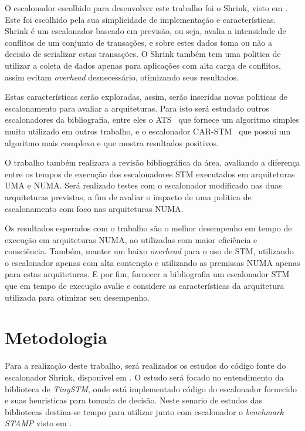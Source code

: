 \documentclass[diss-proposta,nocipinfo]{texufpel}
\begin{document}
O escalonador escolhido para desenvolver este trabalho foi o Shrink, visto em \cite{dragojevic09}. Este foi escolhido pela sua simplicidade de implementação e características. Shrink é um escalonador baseado em previsão, ou seja, avalia a intensidade de conflitos de um conjunto de transações, e sobre estes dados toma ou não a decisão de serializar estas transações. O Shrink também tem uma politica de utilizar a coleta de dados apenas para aplicações com alta carga de conflitos, assim evitam \emph{overhead} desnecessário, otimizando seus resultados.

Estas características serão exploradas, assim, serão inseridas novas politicas de escalonamento para avaliar a arquiteturas. Para isto será estudado outros escalonadores da bibliografia, entre eles o ATS~\cite{yoo08} que fornece um algoritmo simples muito utilizado em outros trabalho, e o escalonador CAR-STM~\cite{dolev08} que possui um algoritmo mais complexo e que mostra resultados positivos.

O trabalho também realizara a revisão bibliográfica da área, avaliando a diferença entre os tempos de execução dos escalonadores STM executados em arquiteturas UMA e NUMA. Será realizado testes com o escalonador modificado nas duas arquiteturas previstas, a fim de avaliar o impacto de uma politica de escalonamento com foco nas arquiteturas NUMA.

Os resultados esperados com o trabalho são o melhor desempenho em tempo de execução em arquiteturas NUMA, ao utilizadas com maior eficiência e consciência. Também, manter um baixo \emph{overhead} para o uso de STM, utilizando o escalonador apenas com alta contenção e utilizando as premissas NUMA apenas para estas arquiteturas. E por fim, fornecer a bibliografia um escalonador STM que em tempo de execução avalie e considere as características da arquitetura utilizada para otimizar seu desempenho.

\chapter{Metodologia}

Para a realização deste trabalho, será realizados os estudos do código fonte do escalonador Shrink, disponivel em \cite{shrink09}. O estudo será focado no entendimento da biblioteca de \emph{TinySTM}, onde está implementado código do escalonador fornecido e suas heuristicas para tomada de decisão. Neste senario de estudos das bibliotecas destina-se tempo para utilizar junto com escalonador o \emph{benchmark STAMP} visto em \cite{STAMP}.
\end{document}
